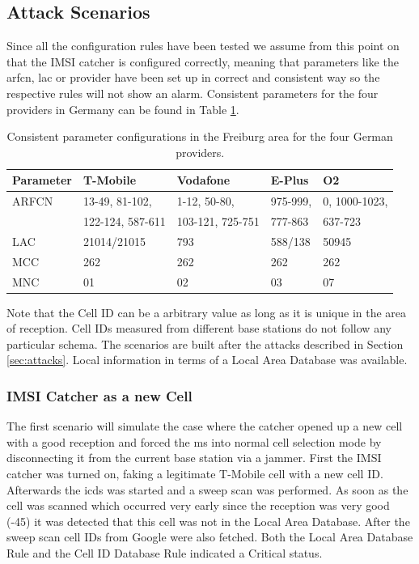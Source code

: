 \subsection{Attack Scenarios}
Since all the configuration rules have been tested we assume from this point on that the IMSI catcher is configured correctly, meaning that  parameters like the \gls{arfcn}, \gls{lac} or provider have been set up in correct and consistent way so the respective rules will not show an alarm.
Consistent parameters for the four providers in Germany can be found in Table \ref{tab:consistent_parameters}.
\begin{table}
\centering
\begin{tabular}{lllll}
\toprule
Parameter	&T-Mobile				&Vodafone			&E-Plus			&O2\\
\midrule
ARFCN		&13-49, 81-102,			&1-12, 50-80,		&975-999,		&0, 1000-1023,\\
			&122-124, 587-611		&103-121, 725-751	&777-863		&637-723\\
LAC			&21014/21015			&793				&588/138		&50945\\
MCC			&262					&262				&262			&262\\
MNC			&01						&02					&03				&07\\
\bottomrule
\end{tabular}
\caption{Consistent parameter configurations in the Freiburg area for the four German providers.}
\label{tab:consistent_parameters}
\end{table}
Note that the Cell ID can be a arbitrary value as long as it is unique in the area of reception. 
Cell IDs measured from different base stations do not follow any particular schema.
The scenarios are built after the attacks described in Section \ref{sec:attacks}.
Local information in terms of a Local Area Database was available.

\subsubsection{IMSI Catcher as a new Cell}
The first scenario will simulate the case where the catcher opened up a new cell with a good reception and forced the \gls{ms} into normal cell selection mode by disconnecting it from the current base station via a jammer.
First the IMSI catcher was turned on, faking a legitimate T-Mobile cell with a new cell ID.
Afterwards the \gls{icds} was started and a sweep scan was performed.
As soon as the cell was scanned which occurred very early since the reception was very good (-45) it was detected that this cell was not in the Local Area Database.
After the sweep scan cell IDs from Google were also fetched.
Both the Local Area Database Rule and the Cell ID Database Rule indicated a Critical status.

